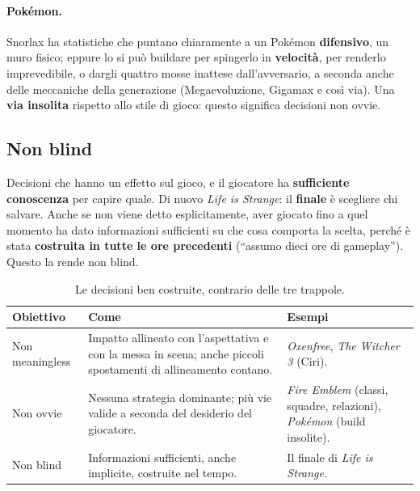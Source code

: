 \paragraph{Pokémon.} Snorlax ha statistiche che puntano chiaramente a un
Pokémon \textbf{difensivo}, un muro fisico; eppure lo si può buildare per
spingerlo in \textbf{velocità}, per renderlo imprevedibile, o dargli quattro
mosse inattese dall'avversario, a seconda anche delle meccaniche della
generazione (Megaevoluzione, Gigamax e così via). Una \textbf{via insolita}
rispetto allo stile di gioco: questo significa decisioni non ovvie.

\subsection{Non blind}

Decisioni che hanno un effetto sul gioco, e il giocatore ha
\textbf{sufficiente conoscenza} per capire quale. Di nuovo \emph{Life is
Strange}: il \textbf{finale} è scegliere chi salvare. Anche se non viene
detto esplicitamente, aver giocato fino a quel momento ha dato informazioni
sufficienti su che cosa comporta la scelta, perché è stata
\textbf{costruita in tutte le ore precedenti} (``assumo dieci ore di
gameplay''). Questo la rende non blind.

\begin{table}[htbp]
  \centering
  \small
  \begin{tabular}{@{}p{}p{}p{}@{}}
    \toprule
    \textbf{Obiettivo} & \textbf{Come} & \textbf{Esempi} \\
    \midrule
    Non meaningless & Impatto allineato con l'aspettativa e con la messa
      in scena; anche piccoli spostamenti di allineamento contano. &
      \emph{Oxenfree}, \emph{The Witcher 3} (Ciri). \\
    Non ovvie & Nessuna strategia dominante; più vie valide a seconda del
      desiderio del giocatore. & \emph{Fire Emblem} (classi, squadre,
      relazioni), \emph{Pokémon} (build insolite). \\
    Non blind & Informazioni sufficienti, anche implicite, costruite nel
      tempo. & Il finale di \emph{Life is Strange}. \\
    \bottomrule
  \end{tabular}
  \caption{Le decisioni ben costruite, contrario delle tre trappole.}
  \label{gd15:tab:buone}
\end{table}

